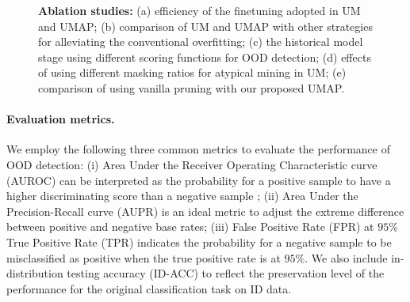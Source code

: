 \documentclass{article}
\theoremstyle{plain}
\theoremstyle{definition}
\theoremstyle{remark}
\begin{document}
\begin{figure*}[t!]
    \begin{center}
    
    \end{center}
    \vspace{-4mm}
    \caption{\textbf{Ablation studies:} (a) efficiency of the finetuning adopted in UM and UMAP; (b) comparison of UM and UMAP with other strategies for alleviating the conventional overfitting; (c) the historical model stage using different scoring functions for OOD detection; (d) effects of using different masking ratios for atypical mining in UM; (e) comparison of using vanilla pruning with our proposed UMAP.
}
\end{figure*}









\paragraph{Evaluation metrics.} We employ the following three common metrics to evaluate the performance of OOD detection: (i) Area Under the Receiver Operating Characteristic curve (AUROC) \citep{inproceedings} can be interpreted as the probability for a positive sample to have a higher discriminating score than a negative sample \citep{fawcett2006introduction}; (ii) Area Under the Precision-Recall curve (AUPR) \citep{manning99foundations} is an ideal metric to adjust the extreme difference between positive and negative base rates; (iii) False Positive Rate (FPR) at $95\%$ True Positive Rate (TPR) \citep{LiangLS18} indicates the probability for a negative sample to be misclassified as positive when the true positive rate is at $95$\%. We also include in-distribution testing accuracy (ID-ACC) to reflect the preservation level of the performance for the original classification task on ID data.
\end{document}
